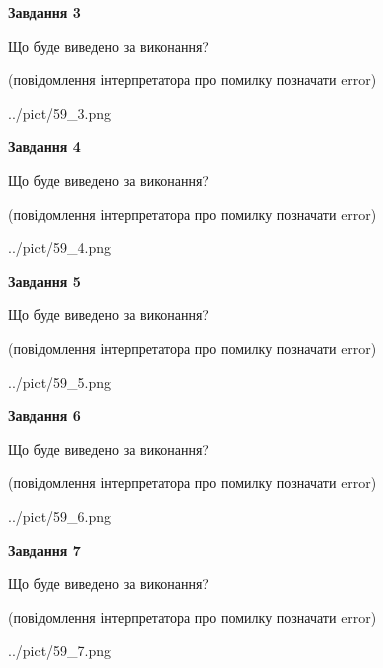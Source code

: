 \documentclass[12pt, ukrainian]{article}
\begin{document}
{\begin {large}
{\begin {center}\textbf{Завдання 3}\end {center}}\par
Що буде виведено за виконання?\par
 (повідомлення інтерпретатора про помилку позначати error)\par
\begin{center}
	{../pict/59_3.png}
\end{center}
\newpage

{\begin {center}\textbf{Завдання 4}\end {center}}\par
Що буде виведено за виконання?\par
 (повідомлення інтерпретатора про помилку позначати error)\par
\begin{center}
	{../pict/59_4.png}
\end{center}
\newpage

{\begin {center}\textbf{Завдання 5}\end {center}}\par
Що буде виведено за виконання?\par
 (повідомлення інтерпретатора про помилку позначати error)\par
\begin{center}
	{../pict/59_5.png}
\end{center}
\newpage

{\begin {center}\textbf{Завдання 6}\end {center}}\par
Що буде виведено за виконання?\par
 (повідомлення інтерпретатора про помилку позначати error)\par
\begin{center}
	{../pict/59_6.png}
\end{center}
\newpage

{\begin {center}\textbf{Завдання 7}\end {center}}\par
Що буде виведено за виконання?\par
 (повідомлення інтерпретатора про помилку позначати error)\par
\begin{center}
	{../pict/59_7.png}
\end{center}
\newpage


\end{large}}
\end{document}

